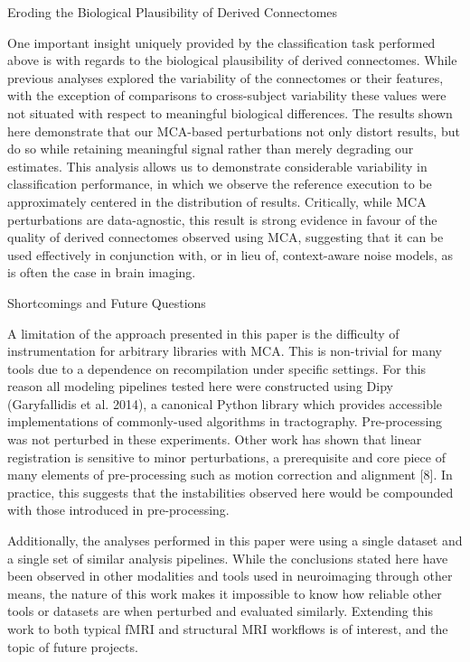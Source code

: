 \documentclass[fleqn,10pt]{SelfArx} %
\begin{document}
Eroding the Biological Plausibility of Derived Connectomes

One important insight uniquely provided by the classification task performed above is with regards to the biological plausibility of derived connectomes. While previous analyses explored the variability of the connectomes or their features, with the exception of comparisons to cross-subject variability these values were not situated with respect to meaningful biological differences. The results shown here demonstrate that our MCA-based perturbations not only distort results, but do so while retaining meaningful signal rather than merely degrading our estimates. This analysis allows us to demonstrate considerable variability in classification performance, in which we observe the reference execution to be approximately centered in the distribution of results. Critically, while MCA perturbations are data-agnostic, this result is strong evidence in favour of the quality of derived connectomes observed using MCA, suggesting that it can be used effectively in conjunction with, or in lieu of, context-aware noise models, as is often the case in brain imaging. 

Shortcomings and Future Questions

A limitation of the approach presented in this paper is the difficulty of instrumentation for arbitrary libraries with MCA. This is non-trivial for many tools due to a dependence on recompilation under specific settings. For this reason all modeling pipelines tested here were constructed using Dipy (Garyfallidis et al. 2014), a canonical Python library which provides accessible implementations of commonly-used algorithms in tractography. Pre-processing was not perturbed in these experiments. Other work has shown that linear registration is sensitive to minor perturbations, a prerequisite and core piece of many elements of pre-processing such as motion correction and alignment [8]. In practice, this suggests that the instabilities observed here would be compounded with those introduced in pre-processing.

Additionally, the analyses performed in this paper were using a single dataset and a single set of similar analysis pipelines. While the conclusions stated here have been observed in other modalities and tools used in neuroimaging through other means, the nature of this work makes it impossible to know how reliable other tools or datasets are when perturbed and evaluated similarly. Extending this work to both typical fMRI and structural MRI workflows is of interest, and the topic of future projects.
\end{document}
